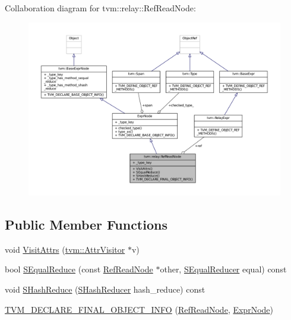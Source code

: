 Collaboration diagram for tvm\+:\+:relay\+:\+:Ref\+Read\+Node\+:
\nopagebreak
\begin{figure}[H]
\begin{center}
\leavevmode
\includegraphics[width=350pt]{classtvm_1_1relay_1_1RefReadNode__coll__graph}
\end{center}
\end{figure}
\subsection*{Public Member Functions}
\begin{DoxyCompactItemize}
\item 
void \hyperlink{classtvm_1_1relay_1_1RefReadNode_a70ea5750f981305f04d0c851e0b46970}{Visit\+Attrs} (\hyperlink{classtvm_1_1AttrVisitor}{tvm\+::\+Attr\+Visitor} $\ast$v)
\item 
bool \hyperlink{classtvm_1_1relay_1_1RefReadNode_a0fabbd159dcfd7ed071f82a679a2cf70}{S\+Equal\+Reduce} (const \hyperlink{classtvm_1_1relay_1_1RefReadNode}{Ref\+Read\+Node} $\ast$other, \hyperlink{classtvm_1_1SEqualReducer}{S\+Equal\+Reducer} equal) const 
\item 
void \hyperlink{classtvm_1_1relay_1_1RefReadNode_ac61f084ccf338ca8dfd2b1319f25cc06}{S\+Hash\+Reduce} (\hyperlink{classtvm_1_1SHashReducer}{S\+Hash\+Reducer} hash\+\_\+reduce) const 
\item 
\hyperlink{classtvm_1_1relay_1_1RefReadNode_af8d21104f0e48e955ec8c007918f9fbe}{T\+V\+M\+\_\+\+D\+E\+C\+L\+A\+R\+E\+\_\+\+F\+I\+N\+A\+L\+\_\+\+O\+B\+J\+E\+C\+T\+\_\+\+I\+N\+FO} (\hyperlink{classtvm_1_1relay_1_1RefReadNode}{Ref\+Read\+Node}, \hyperlink{namespacetvm_1_1relay_a387f18e050d016c52ea6c4781e7cff6c}{Expr\+Node})
\end{DoxyCompactItemize}
